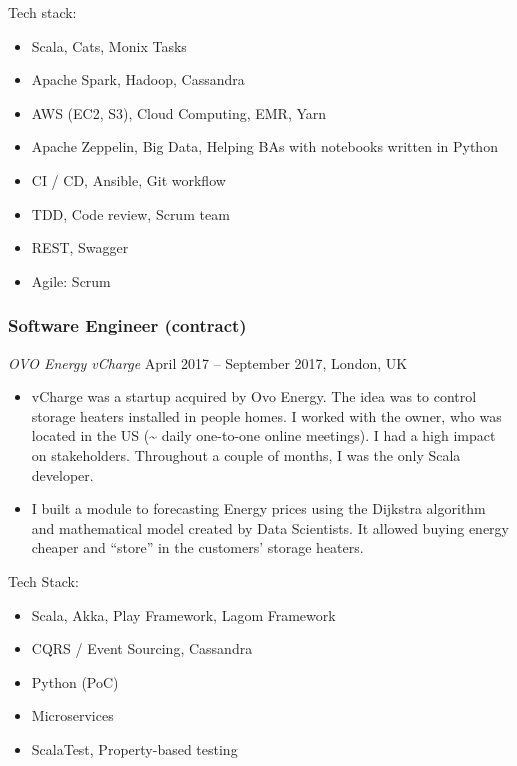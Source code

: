 \documentclass[]{rss}
\providecommand{\tightlist}{%
  \setlength{\itemsep}{0pt}\setlength{\parskip}{0pt}}
\begin{document}
\begin{resume}
Tech stack:

\begin{itemize}
\tightlist
\item
  Scala, Cats, Monix Tasks
\item
  Apache Spark, Hadoop, Cassandra
\item
  AWS (EC2, S3), Cloud Computing, EMR, Yarn
\item
  Apache Zeppelin, Big Data, Helping BAs with notebooks written in
  Python
\item
  CI / CD, Ansible, Git workflow
\item
  TDD, Code review, Scrum team
\item
  REST, Swagger
\item
  Agile: Scrum
\end{itemize}

\hypertarget{software-engineer-contract}{%
\subsubsection{Software Engineer
(contract)}\label{software-engineer-contract}}

\emph{OVO Energy \textbar{} vCharge} April 2017 -- September 2017,
London, UK

\begin{itemize}
\item
  vCharge was a startup acquired by Ovo Energy. The idea was to control
  storage heaters installed in people homes. I worked with the owner,
  who was located in the US (\textasciitilde{} daily one-to-one online
  meetings). I had a high impact on stakeholders. Throughout a couple of
  months, I was the only Scala developer.
\item
  I built a module to forecasting Energy prices using the Dijkstra
  algorithm and mathematical model created by Data Scientists. It
  allowed buying energy cheaper and ``store'' in the customers' storage
  heaters.
\end{itemize}

Tech Stack:

\begin{itemize}
\tightlist
\item
  Scala, Akka, Play Framework, Lagom Framework
\item
  CQRS / Event Sourcing, Cassandra
\item
  Python (PoC)
\item
  Microservices
\item
  ScalaTest, Property-based testing
\end{itemize}


\end{resume}
\end{document}
